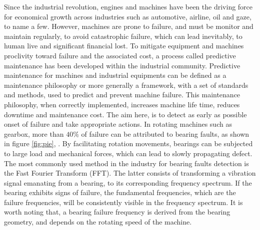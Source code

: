 \documentclass[../Main/thesis.tex]{subfiles}
\begin{document}
Since the industrial revolution, engines and machines have been the driving force for economical growth across industries such as automotive, airline, oil and gaze, to name a few. However, machines are prone to failure, and must be monitor and maintain regularly, to avoid catastrophic failure, which can lead inevitably, to human live and significant financial lost. 
\justify
To mitigate equipment and machines proclivity toward failure and the associated cost, a process called predictive maintenance has been developed within the industrial community. Predictive maintenance  for machines and industrial equipments can be defined as a maintenance philosophy or more generally a framework, with a set of standards and methods, used to predict and prevent machine failure. This maintenance philosophy, when correctly implemented, increases machine life time, reduces downtime and maintenance cost. The aim here, is to detect as early as possible onset of failure and take appropriate actions.
\justify
In rotating machines such as gearbox, more than $40 \% $ of failure can be attributed to bearing faults, as shown in figure \ref{fig:pie}, \cite{patidar13}. By facilitating rotation movements, bearings can be subjected to large load and mechanical forces, which can lead to slowly propagating defect. The most commonly used method in the industry for bearing faults detection is the Fast Fourier Transform (FFT). The latter consists of transforming a vibration signal emanating from a bearing, to its corresponding frequency spectrum. If the bearing exhibits signs of failure, the fundamental frequencies, which are the failure frequencies, will be consistently visible in the frequency spectrum. It is worth noting that, a bearing failure frequency is derived from the bearing geometry, and depends on the rotating speed of the machine.
\end{document}
